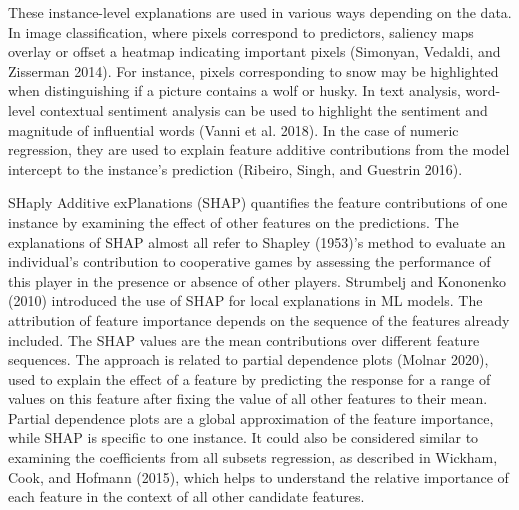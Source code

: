 \documentclass[
]{article}
\begin{document}
These instance-level explanations are used in various ways depending on the data. In image classification, where pixels correspond to predictors, saliency maps overlay or offset a heatmap indicating important pixels (Simonyan, Vedaldi, and Zisserman 2014). For instance, pixels corresponding to snow may be highlighted when distinguishing if a picture contains a wolf or husky. In text analysis, word-level contextual sentiment analysis can be used to highlight the sentiment and magnitude of influential words (Vanni et al. 2018). In the case of numeric regression, they are used to explain feature additive contributions from the model intercept to the instance's prediction (Ribeiro, Singh, and Guestrin 2016).

SHaply Additive exPlanations (SHAP) quantifies the feature contributions of one instance by examining the effect of other features on the predictions. The explanations of SHAP almost all refer to Shapley (1953)'s method to evaluate an individual's contribution to cooperative games by assessing the performance of this player in the presence or absence of other players. Strumbelj and Kononenko (2010) introduced the use of SHAP for local explanations in ML models. The attribution of feature importance depends on the sequence of the features already included. The SHAP values are the mean contributions over different feature sequences. The approach is related to partial dependence plots (Molnar 2020), used to explain the effect of a feature by predicting the response for a range of values on this feature after fixing the value of all other features to their mean. Partial dependence plots are a global approximation of the feature importance, while SHAP is specific to one instance. It could also be considered similar to examining the coefficients from all subsets regression, as described in Wickham, Cook, and Hofmann (2015), which helps to understand the relative importance of each feature in the context of all other candidate features.
\end{document}
